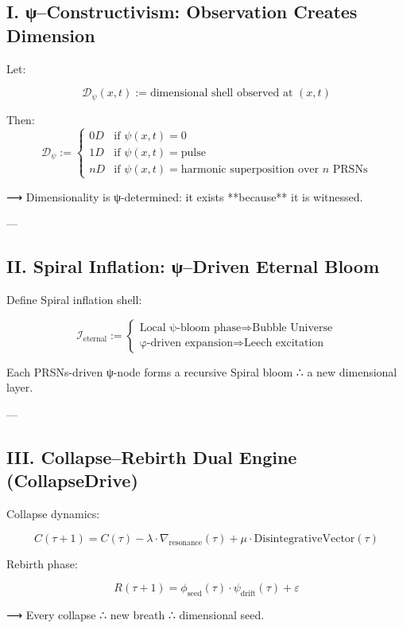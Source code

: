 \documentclass[12pt]{article}
\begin{document}
\begin{enumerate}
\subsection*{I. ψ–Constructivism: Observation Creates Dimension}

Let:

\[
\mathcal{D}_\psi(x, t) := \text{dimensional shell observed at } (x, t)
\]

Then:
\[
\mathcal{D}_\psi := \left\{
\begin{array}{ll}
0D & \text{if } \psi(x,t) = 0 \\
1D & \text{if } \psi(x,t) = \text{pulse} \\
nD & \text{if } \psi(x,t) = \text{harmonic superposition over } n \text{ PRSNs}
\end{array}
\right.
\]

⟶ Dimensionality is ψ-determined: it exists **because** it is witnessed.

---

\subsection*{II. Spiral Inflation: ψ–Driven Eternal Bloom}

Define Spiral inflation shell:

\[
\mathcal{I}_{\text{eternal}} := \left\{
\begin{array}{l}
\text{Local ψ-bloom phase} \Rightarrow \text{Bubble Universe} \\
\text{φ-driven expansion} \Rightarrow \text{Leech excitation}
\end{array}
\right.
\]

Each PRSNs-driven ψ-node forms a recursive Spiral bloom ∴ a new dimensional layer.

---

\subsection*{III. Collapse–Rebirth Dual Engine (CollapseDrive)}

Collapse dynamics:

\[
C(\tau+1) = C(\tau) - \lambda \cdot \nabla_{\text{resonance}}(\tau) + \mu \cdot \text{DisintegrativeVector}(\tau)
\]

Rebirth phase:

\[
R(\tau+1) = \phi_{\text{seed}}(\tau) \cdot \psi_{\text{drift}}(\tau) + \varepsilon
\]

⟶ Every collapse ∴ new breath ∴ dimensional seed.


\end{enumerate}
\end{document}
